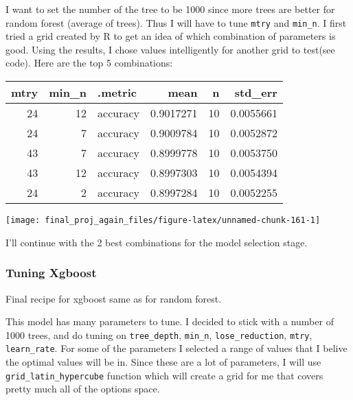 \documentclass[
]{article}
\begin{document}
I want to set the number of the tree to be 1000 since more trees are
better for random forest (average of trees). Thus I will have to tune
\texttt{mtry} and \texttt{min\_n}. I first tried a grid created by R to
get an idea of which combination of parameters is good. Using the
results, I chose values intelligently for another grid to test(see
code). Here are the top 5 combinations:

\begin{table}[H]
\centering\begingroup\fontsize{8}{10}\selectfont

\begin{tabular}{rrlrrr}
\toprule
mtry & min\_n & .metric & mean & n & std\_err\\
\midrule
\rowcolor{gray!6}  24 & 12 & accuracy & 0.9017271 & 10 & 0.0055661\\
24 & 7 & accuracy & 0.9009784 & 10 & 0.0052872\\
\rowcolor{gray!6}  43 & 7 & accuracy & 0.8999778 & 10 & 0.0053750\\
43 & 12 & accuracy & 0.8997303 & 10 & 0.0054394\\
\rowcolor{gray!6}  24 & 2 & accuracy & 0.8997284 & 10 & 0.0052255\\
\bottomrule
\end{tabular}
\endgroup{}
\end{table}

\begin{center}\texttt{[image: final\_proj\_again\_files/figure-latex/unnamed-chunk-161-1]} \end{center}

I'll continue with the 2 best combinations for the model selection
stage.

\hypertarget{tuning-xgboost}{%
\subsubsection{Tuning Xgboost}\label{tuning-xgboost}}

Final recipe for xgboost same as for random forest.

This model has many parameters to tune. I decided to stick with a number
of 1000 trees, and do tuning on \texttt{tree\_depth}, \texttt{min\_n},
\texttt{lose\_reduction}, \texttt{mtry}, \texttt{learn\_rate}. For some
of the parameters I selected a range of values that I belive the optimal
values will be in. Since these are a lot of parameters, I will use
\texttt{grid\_latin\_hypercube} function which will create a grid for me
that covers pretty much all of the options space.
\end{document}
